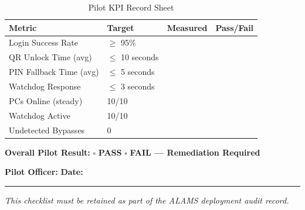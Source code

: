 \begin{table}[h!]
\centering
\caption{Pilot KPI Record Sheet}
\begin{tabularx}{\textwidth}{lllX}
\toprule
\textbf{Metric} & \textbf{Target} & \textbf{Measured} & \textbf{Pass/Fail}\\
\midrule
Login Success Rate & $\geq$ 95\% & \underline{\hspace{2cm}} & \underline{\hspace{2cm}}\\
\rowcolor{aurxonlightgray}
QR Unlock Time (avg) & $\leq$ 10 seconds & \underline{\hspace{2cm}} & \underline{\hspace{2cm}}\\
PIN Fallback Time (avg) & $\leq$ 5 seconds & \underline{\hspace{2cm}} & \underline{\hspace{2cm}}\\
\rowcolor{aurxonlightgray}
Watchdog Response & $\leq$ 3 seconds & \underline{\hspace{2cm}} & \underline{\hspace{2cm}}\\
PCs Online (steady) & 10/10 & \underline{\hspace{2cm}} & \underline{\hspace{2cm}}\\
\rowcolor{aurxonlightgray}
Watchdog Active & 10/10 & \underline{\hspace{2cm}} & \underline{\hspace{2cm}}\\
Undetected Bypasses & 0 & \underline{\hspace{2cm}} & \underline{\hspace{2cm}}\\
\bottomrule
\end{tabularx}
\end{table}

\textbf{Overall Pilot Result:} \quad $\square$ \textbf{PASS} \quad $\square$ \textbf{FAIL — Remediation Required}

\textbf{Pilot Officer:} \underline{\hspace{6cm}} \quad \textbf{Date:} \underline{\hspace{3cm}}

\noindent\rule{\textwidth}{1pt}

\textit{This checklist must be retained as part of the ALAMS deployment audit record.}
